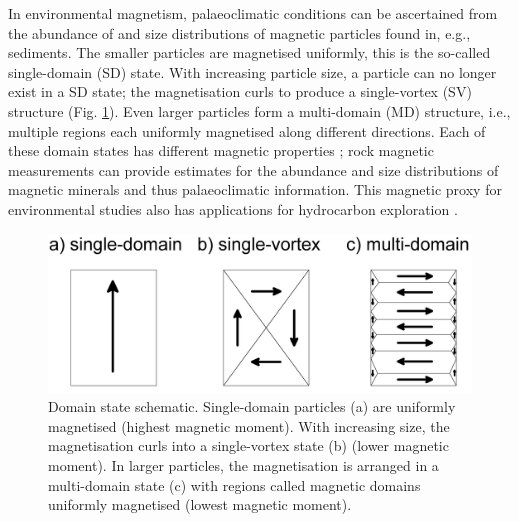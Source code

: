 In environmental magnetism, palaeoclimatic conditions can be ascertained from the abundance of and size distributions of magnetic particles found in, e.g., sediments. The smaller particles are magnetised uniformly, this is the so-called single-domain (SD) state. With increasing particle size, a particle can no longer exist in a SD state; the magnetisation curls to produce a single-vortex (SV) structure \citep{Roberts2017} (Fig. \ref{schematic_domains}). Even larger particles form a multi-domain (MD) structure, i.e., multiple regions each uniformly magnetised along different directions. Each of these domain states has different magnetic properties \citep{Dunlop}; rock magnetic measurements can provide estimates for the abundance and size distributions of magnetic minerals and thus palaeoclimatic information. This magnetic proxy for environmental studies also has applications for hydrocarbon exploration \citep{Emmerton2013B,Abubakar2015}.
\begin{figure}
\centering
\includegraphics[width=\textwidth]{intro/figs/schematic_domains.pdf}
\caption[Domain state schematic]{Domain state schematic. Single-domain particles (a) are uniformly magnetised (highest magnetic moment). With increasing size, the magnetisation curls into a single-vortex state (b) (lower magnetic moment). In larger particles, the magnetisation is arranged in a multi-domain state (c) with regions called magnetic domains uniformly magnetised (lowest magnetic moment).}
\label{schematic_domains}
\end{figure}\par

